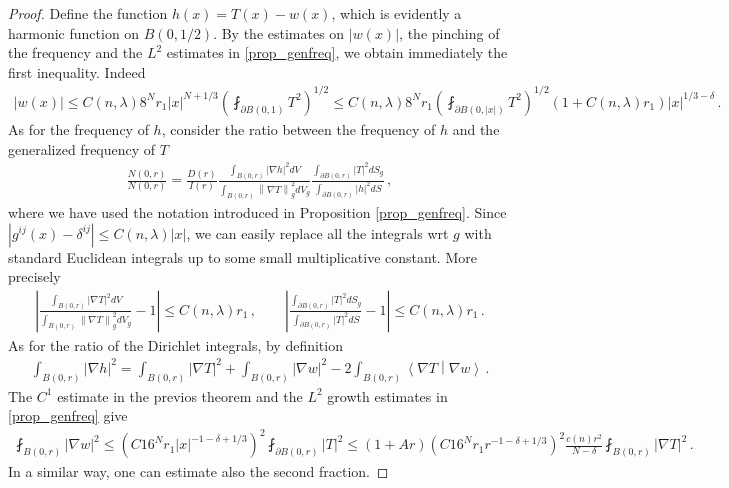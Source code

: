 \documentclass[11pt]{article}
\begin{document}
\begin{proof}
 Define the function $h(x)=T(x)-w(x)$, which is evidently a harmonic function on $B(0,1/2)$. By the estimates on ${\left|{w(x)}\right|}$, the pinching of the frequency and the $L^2$ estimates in \ref{prop_genfreq}, we obtain immediately the first inequality. Indeed
 \begin{gather}\label{eq_wT}
  {\left|{w(x)}\right|}\leq C(n,\lambda) 8^N r_1 {\left|{x}\right|} ^{N+1/3} {\left({\fint_{\partial B(0,1)} T^2}\right)}^{1/2}\leq C(n,\lambda) 8^N r_1 {\left({\fint_{\partial B(0,{\left|x\right|})} T^2}\right)}^{1/2} (1+C(n,\lambda) r_1) {\left|x\right|} ^{1/3-\delta}\, .
 \end{gather}
As for the frequency of $h$, consider the ratio between the frequency of $h$ and the generalized frequency of $T$
\begin{gather}
 \frac{N(0,r)}{N(0,r)} = \frac{D(r)}{I(r)}\frac{ \int_{B(0,r)} {\left|{\nabla h}\right|}^2 dV }{ \int_{B(0,r)} {\left\|{\nabla T}\right\|}_g^2 dV_g  } \frac{\int_{\partial B(0,r)} {\left|{T}\right|}^2 dS_g }{\int_{\partial B(0,r)} {\left|{h}\right|}^2 dS }\, ,
\end{gather}
where we have used the notation introduced in Proposition \ref{prop_genfreq}. Since ${\left|{g^{ij}(x)-\delta^{ij}}\right|} \leq C(n,\lambda) {\left|x\right|}$, we can easily replace all the integrals wrt $g$ with standard Euclidean integrals up to some small multiplicative constant. More precisely
\begin{gather}
 {\left|{\frac{ \int_{B(0,r)} {\left|{\nabla T}\right|}^2 dV }{ \int_{B(0,r)} {\left\|{\nabla T}\right\|}_g^2 dV_g  }  -1}\right|} \leq C(n,\lambda) r_1\, , \quad \quad {\left|{\frac{\int_{\partial B(0,r)} {\left|{T}\right|}^2 dS_g }{\int_{\partial B(0,r)} {\left|{T}\right|}^2 dS }-1}\right|}\leq C(n,\lambda)r_1\, .
\end{gather}
As for the ratio of the Dirichlet integrals, by definition
\begin{gather}
\int_{B(0,r)} {\left|{\nabla h}\right|}^2 = \int_{B(0,r)} {\left|{\nabla T}\right|}^2 + \int_{B(0,r)} {\left|{\nabla w}\right|}^2 -2 \int_{B(0,r)} {\left\langle{\nabla T}\middle\vert{\nabla w}\right\rangle}\, .
\end{gather}
The $C^1$ estimate in the previos theorem and the $L^2$ growth estimates in \ref{prop_genfreq} give
\begin{gather}
 \fint_{B(0,r)} {\left|{\nabla w}\right|}^2 \leq {\left({C16^N r_1 {\left|x\right|} ^{-1-\delta+1/3} }\right)}^2 \fint_{\partial B(0,r)} {\left|T\right|}^2 \leq (1+Ar) {\left({C16^N r_1 r ^{-1-\delta+1/3} }\right)}^2 \frac{c(n) r^2}{N-\delta} \fint_{B(0,r)} {\left|{\nabla T}\right|}^2\, .
\end{gather}
In a similar way, one can estimate also the second fraction.
\end{proof}
\end{document}

